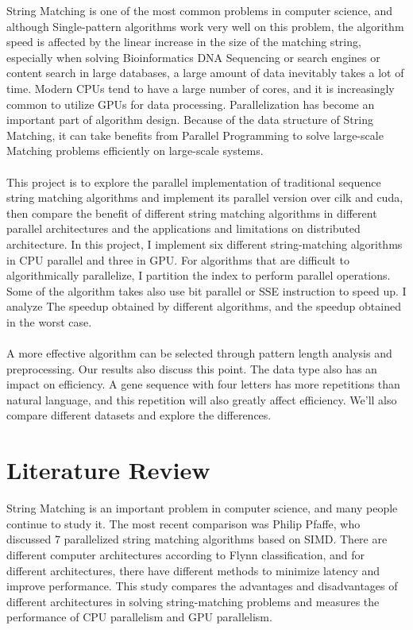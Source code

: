 \documentclass[11pt]{article}       %
\begin{document}
String Matching is one of the most common problems in computer science, and although Single-pattern algorithms work very well on this problem, the algorithm speed is affected by the linear increase in the size of the matching string, especially when solving Bioinformatics DNA Sequencing or search engines or content search in large databases, a large amount of data inevitably takes a lot of time. Modern CPUs tend to have a large number of cores, and it is increasingly common to utilize GPUs for data processing. Parallelization has become an important part of algorithm design. Because of the data structure of String Matching, it can take benefits  from Parallel Programming to solve large-scale Matching problems efficiently on large-scale systems.\\
\\This project is to explore the parallel implementation of traditional sequence string matching algorithms and implement its parallel version over cilk and cuda, then compare the benefit of different string matching algorithms in different parallel architectures and the applications and limitations on distributed architecture. In this project, I implement six different string-matching algorithms in CPU parallel and three in GPU. For algorithms that are difficult to algorithmically parallelize, I partition the index to perform parallel operations. Some of the algorithm takes also use bit parallel or SSE instruction to speed up. I analyze The speedup obtained by different algorithms, and the speedup obtained in the worst case.\\ 
\\A more effective algorithm can be selected through pattern length analysis and preprocessing. Our results also discuss this point. The data type also has an impact on efficiency. A gene sequence with four letters has more repetitions than natural language, and this repetition will also greatly affect efficiency. We'll also compare different datasets and explore the differences.\\




\section{Literature Review} \label{litrev}

String Matching is an important problem in computer science, and many people continue to study it. The most recent comparison was Philip Pfaffe, who discussed 7 parallelized string matching algorithms based on SIMD\cite{Matching}. There are different computer architectures according to Flynn classification, and for different architectures, there have different methods to minimize latency and improve performance. This study compares the advantages and disadvantages of different architectures in solving string-matching problems and measures the performance of CPU parallelism and GPU parallelism. \\
\end{document}

